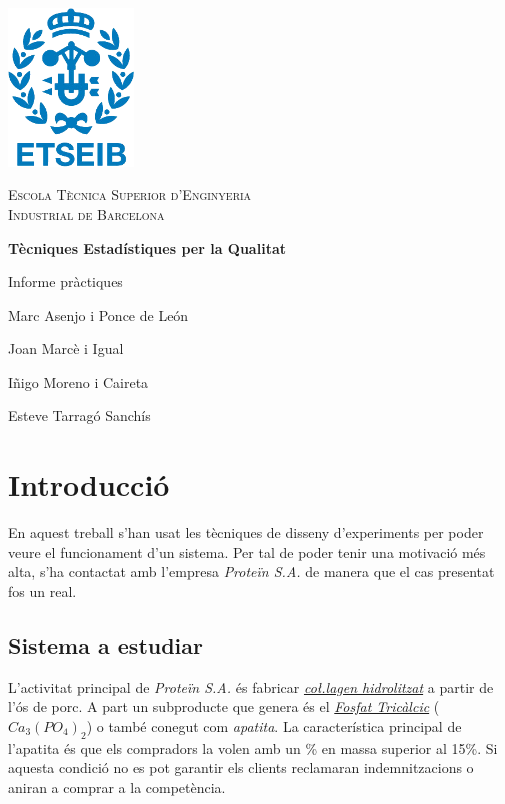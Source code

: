 \documentclass[a4paper]{article}
\begin{document}
\begin{titlepage}
	\centering
	\vspace{1cm}
	\includegraphics[width=0.25\textwidth]{images/etseib}
	\par\vspace{1cm}
	\textsc{ \LARGE Escola Tècnica Superior d'Enginyeria \\[1em] 
		Industrial de Barcelona}
	\par\vspace{2cm}
	\textbf{\Huge Tècniques Estadístiques per la Qualitat}
	\par\vspace{2cm}
	{\LARGE Informe pràctiques}
	\vfill
	\begin{flushright}
		\large
		Marc Asenjo i Ponce de León \par
		Joan Marcè i Igual \par
		Iñigo Moreno i Caireta \par
		Esteve Tarragó Sanchís \par
	\end{flushright}
\end{titlepage}

\tableofcontents
\pagebreak

\section{Introducció}
En aquest treball s'han usat les tècniques de disseny d'experiments per poder veure el funcionament d'un sistema. Per tal de poder tenir una motivació més alta, s'ha contactat amb l'empresa \emph{Proteïn S.A.} de manera que el cas presentat fos un real. 

\subsection{Sistema a estudiar}
L'activitat principal de \emph{Proteïn S.A.} és fabricar  \emph{\href{https://es.wikipedia.org/wiki/Col\%C3\%A1geno_hidrolizado}{co\l.lagen hidrolitzat}} a partir de l'ós de porc. A part un subproducte que genera és el \emph{\href{https://es.wikipedia.org/wiki/Fosfato_tric\%C3\%A1lcico}{Fosfat Tricàlcic}} ($Ca_3 (PO_4)_2$) o també conegut com \emph{apatita}. La característica principal de l'apatita és que els compradors la volen amb un \% en massa superior al 15\%. Si aquesta condició no es pot garantir els clients reclamaran indemnitzacions o aniran a comprar a la competència.
\end{document}

